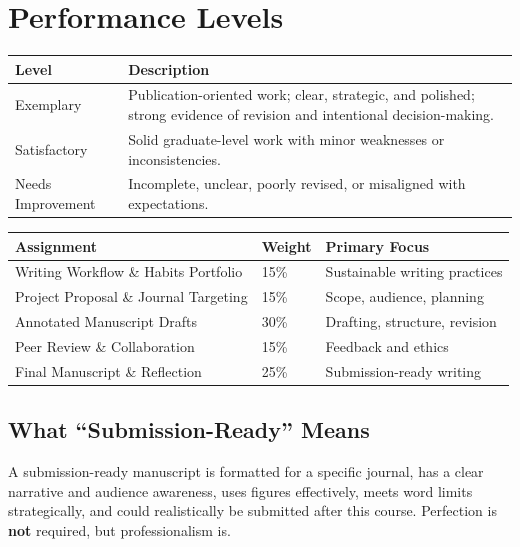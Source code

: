 \documentclass[10pt]{article}
\begin{document}
	\vspace{0.5em}
	
	\section*{Performance Levels}
	
	\begin{tabular}{p{} p{}}
		\toprule
		\textbf{Level} & \textbf{Description} \\
		\midrule
		Exemplary &
		Publication-oriented work; clear, strategic, and polished; strong evidence of revision and
		intentional decision-making. \\
		Satisfactory &
		Solid graduate-level work with minor weaknesses or inconsistencies. \\
		Needs Improvement &
		Incomplete, unclear, poorly revised, or misaligned with expectations. \\
		\bottomrule
	\end{tabular}
	
	
	\begin{tabular}{p{} p{} p{}}
		\toprule
		\textbf{Assignment} & \textbf{Weight} & \textbf{Primary Focus} \\
		\midrule
		Writing Workflow \& Habits Portfolio & 15\% & Sustainable writing practices \\
		Project Proposal \& Journal Targeting & 15\% & Scope, audience, planning \\
		Annotated Manuscript Drafts & 30\% & Drafting, structure, revision \\
		Peer Review \& Collaboration & 15\% & Feedback and ethics \\
		Final Manuscript \& Reflection & 25\% & Submission-ready writing \\
		\bottomrule
	\end{tabular}
	
	
	\subsection*{What ``Submission-Ready'' Means}
	
	A submission-ready manuscript is formatted for a specific journal, has a clear narrative and 
	audience awareness, uses figures effectively, meets word limits strategically, and could  
	realistically be submitted after this course.
	Perfection is \textbf{not} required, but professionalism is.
	
\end{document}
